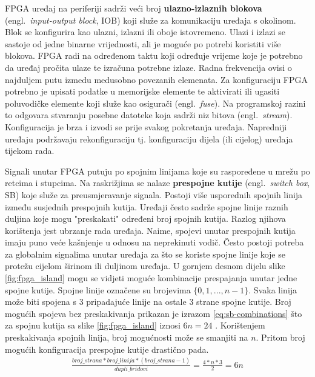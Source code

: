 \documentclass[times, utf8, diplomski]{fer}
\begin{document}
FPGA uređaj na periferiji sadrži veći broj \textbf{ulazno-izlaznih blokova} (engl.~\textit{input-output block}, IOB) koji služe za komunikaciju uređaja s okolinom. Blok se konfigurira kao ulazni, izlazni ili oboje istovremeno. Ulazi i izlazi se sastoje od jedne binarne vrijednosti, ali je moguće po potrebi koristiti više blokova. FPGA radi na određenom taktu koji određuje vrijeme koje je potrebno da uređaj pročita ulaze te izračuna potrebne izlaze. Radna frekvencija ovisi o najduljem putu izmedu medusobno povezanih elemenata. Za konfiguraciju FPGA potrebno je upisati podatke u memorijske elemente te aktivirati ili ugasiti poluvodičke elemente koji služe kao osigurači (engl.~\textit{fuse}). Na programskoj razini to odgovara stvaranju posebne datoteke koja sadrži niz bitova (engl.~\textit{stream}). Konfiguracija je brza i izvodi se prije svakog pokretanja uređaja. Napredniji uređaju podržavaju rekonfiguraciju tj. konfiguraciju dijela (ili cijelog) uređaja tijekom rada.

Signali unutar FPGA putuju po spojnim linijama koje su raspoređene u mrežu po retcima i stupcima. Na raskrižjima se nalaze \textbf{prespojne kutije} (engl.~\textit{switch box}, SB) koje služe za preusmjeravanje signala. Postoji više usporednih spojnih linija između susjednih prespojnih kutija. Uređaji često sadrže spojne linije raznih duljina koje mogu "preskakati" određeni broj spojnih kutija. Razlog njihova korištenja jest ubrzanje rada uređaja. Naime, spojevi unutar prespojnih kutija imaju puno veće kašnjenje u odnosu na neprekinuti vodič. Često postoji potreba za globalnim signalima unutar uređaja za što se koriste spojne linije koje se protežu cijelom širinom ili duljinom uređaja. U gornjem desnom dijelu slike \ref{fig:fpga_island} mogu se vidjeti moguće kombinacije prespajanja unutar jedne spojne kutije. Spojne linije označene su brojevima $\{0, 1, ..., n-1\}$. Svaka linija može biti spojena s $3$ pripadajuće linije na ostale $3$ strane spojne kutije. Broj mogućih spojeva bez preskakivanja prikazan je izrazom \ref{eq:sb-combinations} što za spojnu kutija sa slike \ref{fig:fpga_island} iznosi $6n = 24$ \cite{article:switchBox}. Korištenjem preskakivanja spojnih linija, broj mogućnosti može se smanjiti na $n$. Pritom broj mogućih konfiguracija prespojne kutije drastično pada.
%
\begin{gather}
	\label{eq:sb-combinations}
	\frac{broj\_strana * broj\_linija * (broj\_strana - 1)}{dupli\_bridovi} = \frac{4 * n * 3}{2} = 6n
\end{gather}
\end{document}
